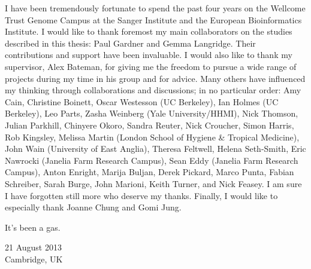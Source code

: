 

\begin{acknowledgementslong} 

I have been tremendously fortunate to spend the past four years on the Wellcome Trust Genome Campus at the Sanger Institute and the European Bioinformatics Institute. I would like to thank foremost my main collaborators on the studies described in this thesis: Paul Gardner and Gemma Langridge. Their contributions and support have been invaluable. I would also like to thank my supervisor, Alex Bateman, for giving me the freedom to pursue a wide range of projects during my time in his group and for advice. Many others have influenced my thinking through collaborations and discussions; in no particular order: Amy Cain, Christine Boinett, Oscar Westesson (UC Berkeley), Ian Holmes (UC Berkeley), Leo Parts, Zasha Weinberg (Yale University/HHMI), Nick Thomson, Julian Parkhill, Chinyere Okoro, Sandra Reuter, Nick Croucher, Simon Harris, Rob Kingsley, Melissa Martin (London School of Hygiene \& Tropical Medicine), John Wain (University of East Anglia), Theresa Feltwell, Helena Seth-Smith, Eric Nawrocki (Janelia Farm Research Campus), Sean Eddy (Janelia Farm Research Campus), Anton Enright, Marija Buljan, Derek Pickard, Marco Punta, Fabian Schreiber, Sarah Burge, John Marioni, Keith Turner, and Nick Feasey. I am sure I have forgotten still more who deserve my thanks. Finally, I would like to especially thank Joanne Chung and Gomi Jung. 

\vspace{\baselineskip}
\noindent
It's been a gas.

\vspace{\baselineskip}
\noindent
\begin{flushright}
21 August 2013\\
Cambridge, UK
\end{flushright}

\end{acknowledgementslong}


